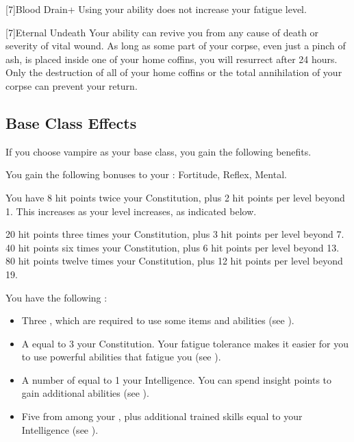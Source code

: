 [7]{Blood Drain+} Using your  ability does not increase your fatigue level.

[7]{Eternal Undeath} Your  ability can revive you from any cause of death or severity of vital wound.
As long as some part of your corpse, even just a pinch of ash, is placed inside one of your home coffins, you will resurrect after 24 hours.
Only the destruction of all of your home coffins or the total annihilation of your corpse can prevent your return.

\subsection{Base Class Effects}
If you choose vampire as your base class, you gain the following benefits.

You gain the following bonuses to your :  Fortitude,  Reflex,  Mental.

You have 8 hit points \add twice your Constitution, plus 2 hit points per level beyond 1.
This increases as your level increases, as indicated below.
\begin{itemize}
	 20 hit points \add three times your Constitution, plus 3 hit points per level beyond 7.
	 40 hit points \add six times your Constitution, plus 6 hit points per level beyond 13.
	 80 hit points \add twelve times your Constitution, plus 12 hit points per level beyond 19.
\end{itemize}

 You have the following :
\begin{itemize}
	\item Three , which are required to use some items and abilities (see ).
	\item A  equal to 3 \add your Constitution.
	      Your fatigue tolerance makes it easier for you to use powerful abilities that fatigue you (see ).
	\item A number of  equal to 1 \add your Intelligence.
	      You can spend insight points to gain additional abilities (see ).
	\item Five  from among your , plus additional trained skills equal to your Intelligence (see ).
\end{itemize}


